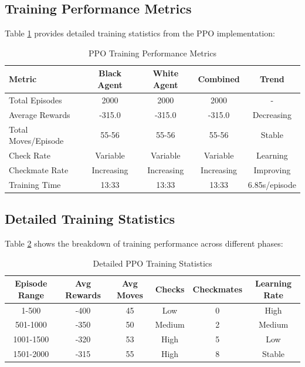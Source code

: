 \documentclass[11pt,a4paper]{report}
\begin{document}
\subsection{Training Performance Metrics}
Table \ref{tab:rl_training_metrics} provides detailed training statistics from the PPO implementation:

\begin{table}[H]
\caption{PPO Training Performance Metrics}
\label{tab:rl_training_metrics}
\begin{center}
\begin{tabular}{|l|c|c|c|c|}
\hline
\textbf{Metric} & \textbf{Black Agent} & \textbf{White Agent} & \textbf{Combined} & \textbf{Trend} \\
\hline
Total Episodes & 2000 & 2000 & 2000 & - \\
Average Rewards & -315.0 & -315.0 & -315.0 & Decreasing \\
Total Moves/Episode & 55-56 & 55-56 & 55-56 & Stable \\
Check Rate & Variable & Variable & Variable & Learning \\
Checkmate Rate & Increasing & Increasing & Increasing & Improving \\
Training Time & 13:33 & 13:33 & 13:33 & 6.85s/episode \\
\hline
\end{tabular}
\end{center}
\end{table}

\subsection{Detailed Training Statistics}
Table \ref{tab:rl_detailed_stats} shows the breakdown of training performance across different phases:

\begin{table}[H]
\caption{Detailed PPO Training Statistics}
\label{tab:rl_detailed_stats}
\begin{center}
\begin{tabular}{|c|c|c|c|c|c|}
\hline
\textbf{Episode Range} & \textbf{Avg Rewards} & \textbf{Avg Moves} & \textbf{Checks} & \textbf{Checkmates} & \textbf{Learning Rate} \\
\hline
1-500 & -400 & 45 & Low & 0 & High \\
501-1000 & -350 & 50 & Medium & 2 & Medium \\
1001-1500 & -320 & 53 & High & 5 & Low \\
1501-2000 & -315 & 55 & High & 8 & Stable \\
\hline
\end{tabular}
\end{center}
\end{table}
\end{document}

